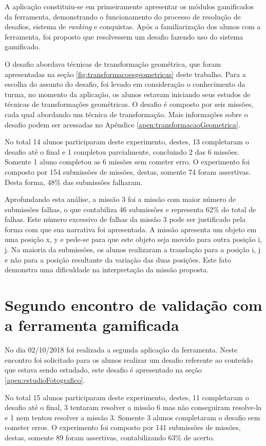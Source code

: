 \documentclass[
	12pt,				%
	oneside,			%
	a4paper,			%
	english,			%
	french,				%
	spanish,			%
	brazil,				%
	]{abntex2}
\begin{document}
A aplicação constituiu-se em primeiramente apresentar os módulos gamificados da ferramenta, demonstrando o funcionamento do processo de resolução de desafios, sistema de \textit{ranking} e conquistas. Após a familiarização dos alunos com a ferramenta, foi proposto que resolvessem um desafio fazendo uso do sistema gamificado.

O desafio abordava técnicas de transformação geométrica, que foram apresentadas na seção \ref{fig:transformacoesgeometricas} deste trabalho. Para a escolha do assunto do desafio, foi levado em consideração o conhecimento da turma, no momento da aplicação, os alunos estavam iniciando seus estudos de técnicas de transformações geométricas. O desafio é composto por seis missões, cada qual abordando um técnica de transformação. Mais informações sobre o desafio podem ser acessadas no Apêndice \ref{apen:transformacaoGeometrica}.

No total 14 alunos participaram deste experimento, destes, 13 completaram o desafio até o final e 1 completou parcialmente, concluindo 2 das 6 missões. Somente 1 aluno completou as 6 missões sem cometer erro. O experimento foi composto por 154 submissões de missões, destas, somente 74 foram assertivas. Desta forma, 48\% das submissões falharam.

Aprofundando esta análise, a missão 3 foi a missão com maior número de submissões falhas, o que contabiliza 46 submissões e representa 62\% do total de falhas. Este número excessivo de falhas da missão 3 pode ser justificado pela forma com que sua narrativa foi apresentada. A missão apresenta um objeto em uma posição x, y e pede-se para que este objeto seja movido para outra posição i, j. Na maioria da submissões, os alunos realizaram a translação para a posição i, j e não para a posição resultante da variação das duas posições. Este fato demonstra uma dificuldade na interpretação da missão proposta.

\section{Segundo encontro de validação com a ferramenta gamificada}

No dia 02/10/2018 foi realizada a segunda aplicação da ferramenta. Neste encontro foi solicitado para os alunos realizar um desafio referente ao conteúdo que estava sendo estudado, este desafio é apresentado na seção \ref{apen:estudioFotografico}.

No total 15 alunos participaram deste experimento, destes, 11 completaram o desafio até o final, 3 tentaram resolver a missão 6 mas não conseguiram resolve-la e 1 nem tentou resolver a missão 3. Somente 3 alunos completaram o desafio sem cometer erros. O experimento foi composto por 141 submissões de missões, destas, somente 89 foram assertivas, contabilizando 63\% de acerto.
\end{document}
